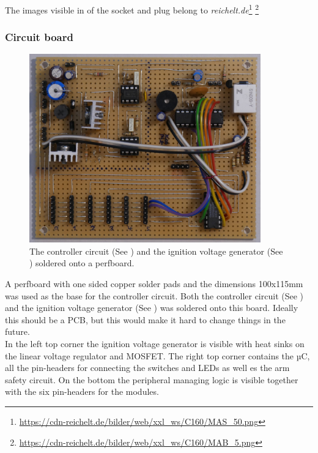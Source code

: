 \noindent The images visible in  of the socket and plug belong to \textit{reichelt.de}\footnote{\url{https://cdn-reichelt.de/bilder/web/xxl_ws/C160/MAS_50.png}} \footnote{\url{https://cdn-reichelt.de/bilder/web/xxl_ws/C160/MAB_5.png}}\\

\pagebreak

\subsubsection{Circuit board}
\label{Circuitboard}

\begin{figure}[!ht]
    \centering
    \includegraphics[width=10cm]{./Figures/controller_circuit_soldered.JPG}
    \caption{The controller circuit (See ) and the ignition voltage generator (See ) soldered onto a perfboard.   }
    \label{fig:controller_circuit_soldered}     
\end{figure}

\noindent A perfboard with one sided copper solder pads and the dimensions 100x115mm was used as the base for the controller circuit. Both the controller circuit (See ) and the ignition voltage generator (See ) was soldered onto this board. Ideally this should be a PCB, but this would make it hard to change things in the future. \\

\noindent In the left top corner the ignition voltage generator is visible with heat sinks on the linear voltage regulator and MOSFET. The right top corner contains the µC, all the pin-headers for connecting the switches and LEDs as well es the arm safety circuit. On the bottom the peripheral managing logic is visible together with the six pin-headers for the modules.

